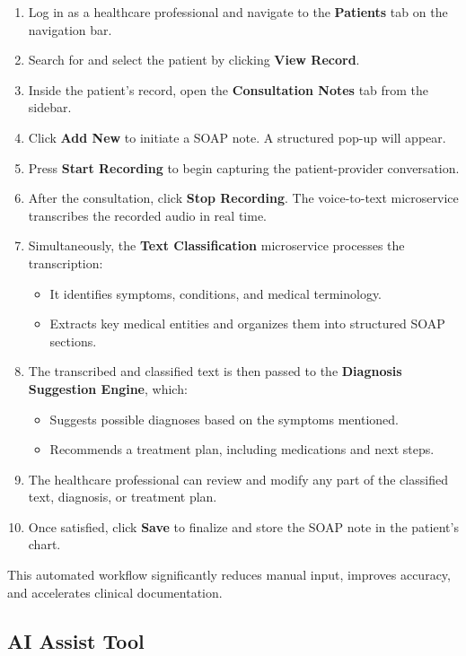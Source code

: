 \documentclass[12pt, titlepage]{article}
\begin{document}
\begin{enumerate}
    \item Log in as a healthcare professional and navigate to the \textbf{Patients} tab on the navigation bar.
    \item Search for and select the patient by clicking \textbf{View Record}.
    \item Inside the patient’s record, open the \textbf{Consultation Notes} tab from the sidebar.
    \item Click \textbf{Add New} to initiate a SOAP note. A structured pop-up will appear.
    \item Press \textbf{Start Recording} to begin capturing the patient-provider conversation.
    \item After the consultation, click \textbf{Stop Recording}. The voice-to-text microservice transcribes the recorded audio in real time.
    \item Simultaneously, the \textbf{Text Classification} microservice processes the transcription:
    \begin{itemize}
        \item It identifies symptoms, conditions, and medical terminology.
        \item Extracts key medical entities and organizes them into structured SOAP sections.
    \end{itemize}
    \item The transcribed and classified text is then passed to the \textbf{Diagnosis Suggestion Engine}, which:
    \begin{itemize}
        \item Suggests possible diagnoses based on the symptoms mentioned.
        \item Recommends a treatment plan, including medications and next steps.
    \end{itemize}
    \item The healthcare professional can review and modify any part of the classified text, diagnosis, or treatment plan.
    \item Once satisfied, click \textbf{Save} to finalize and store the SOAP note in the patient’s chart.
\end{enumerate}

This automated workflow significantly reduces manual input, improves accuracy, and accelerates clinical documentation.

\subsection{AI Assist Tool}
\end{document}
